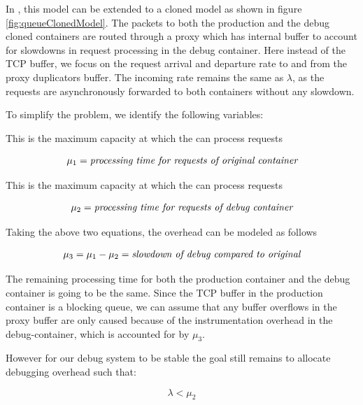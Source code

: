 In \parikshan, this model can be extended to a cloned model as shown in figure \ref{fig:queueClonedModel}.
The packets to both the production and the debug cloned containers are routed through a proxy which has internal buffer to account for slowdowns in request processing in the debug container. 
Here instead of the TCP buffer, we focus on the request arrival and departure rate to and from the proxy duplicators buffer.
The incoming rate remains the same as $\lambda$, as the requests are asynchronously forwarded to both containers without any slowdown. 

To simplify the problem, we identify the following variables:

This is the maximum capacity at which the \productioncontainer can process requests

\begin{equation}\label{eq:1}
\mu_{1} = \emph{processing time for requests of original container}
\end{equation}

This is the maximum capacity at which the \debugcontainer can process requests

\begin{equation}\label{eq:2}
\mu_{2} = \emph{processing time for requests of debug container}
\end{equation}

Taking the above two equations, the overhead can be modeled as follows

\begin{equation}\label{eq:3}
\mu_{3} = \mu_{1} - \mu_{2}  = \emph{slowdown of debug compared to original}
\end{equation}

The remaining processing time for both the production container and the debug container is going to be the same. 
Since the TCP buffer in the production container is a blocking queue, we can assume that any buffer overflows in the proxy buffer are only caused because of the instrumentation overhead in the debug-container, which is accounted for by $\mu_{3}$.

However for our debug system to be stable the goal still remains to allocate debugging overhead such that:

\begin{equation}\label{eq:four}
  \lambda < \mu_{2}
\end{equation}

